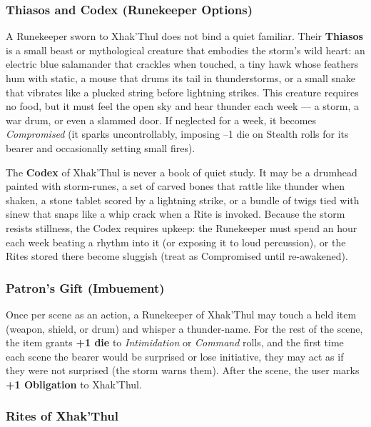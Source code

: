 \subsubsection*{Thiasos and Codex (Runekeeper Options)}

A Runekeeper sworn to Xhak'Thul does not bind a quiet familiar. Their \textbf{Thiasos} is a small beast or mythological creature that embodies the storm's wild heart: an electric blue salamander that crackles when touched, a tiny hawk whose feathers hum with static, a mouse that drums its tail in thunderstorms, or a small snake that vibrates like a plucked string before lightning strikes. This creature requires no food, but it must feel the open sky and hear thunder each week --- a storm, a war drum, or even a slammed door. If neglected for a week, it becomes \textit{Compromised} (it sparks uncontrollably, imposing --1 die on Stealth rolls for its bearer and occasionally setting small fires).

The \textbf{Codex} of Xhak'Thul is never a book of quiet study. It may be a drumhead painted with storm-runes, a set of carved bones that rattle like thunder when shaken, a stone tablet scored by a lightning strike, or a bundle of twigs tied with sinew that snaps like a whip crack when a Rite is invoked. Because the storm resists stillness, the Codex requires upkeep: the Runekeeper must spend an hour each week beating a rhythm into it (or exposing it to loud percussion), or the Rites stored there become sluggish (treat as Compromised until re-awakened).

\subsubsection*{Patron's Gift (Imbuement)}

Once per scene as an action, a Runekeeper of Xhak'Thul may touch a held item (weapon, shield, or drum) and whisper a thunder-name. For the rest of the scene, the item grants \textbf{+1 die} to \textit{Intimidation} or \textit{Command} rolls, and the first time each scene the bearer would be surprised or lose initiative, they may act as if they were not surprised (the storm warns them). After the scene, the user marks \textbf{+1 Obligation} to Xhak'Thul.

\subsubsection*{Rites of Xhak'Thul}

